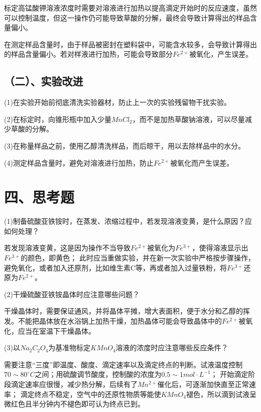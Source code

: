 \documentclass[a4paper,12pt]{article}
\begin{document}
标定高锰酸钾溶液浓度时需要对溶液进行加热以提高滴定开始时的反应速度，虽然可以控制温度，但这一操作仍可能导致草酸的分解，最终会导致计算得出的样品含量偏小。

在测定样品含量时，由于样品被密封在塑料袋中，可能含水较多，会导致计算得出的样品含量偏小。若对样液进行加热，可能会导致部分$ Fe^{2+}$被氧化，产生误差。

\subsection*{（二）、实验改进}
(1)在实验开始前彻底清洗实验器材，防止上一次的实验残留物干扰实验。

(2)在标定时，向锥形瓶中加入少量$ MnCl_2$，而不是加热草酸钠溶液，可以尽量减少草酸的分解。

(3)在称量样品之前，使用乙醇清洗样品，而后晾干，用以去除样品中的水分。

(4)测定样品含量时，避免对溶液进行加热，防止$ Fe^{2+}$被氧化而产生误差。



\section*{四、思考题}

(1)制备硫酸亚铁铵时，在蒸发、浓缩过程中，若发现溶液变黄，是什么原因？应如何处理？

若发现溶液变黄，这是因为操作不当导致$ Fe^{2+}$被氧化为$ Fe^{3+}$，使得溶液显示出$ Fe^{3+}$的颜色，即黄色；
此时应当重做实验，并在新一次实验中严格按步骤操作，避免氧化，或者加入还原剂，比如维生素C等，再或者加入过量铁粉，将$ Fe^{3+}$还原为$ Fe^{2+}$。

(2)干燥硫酸亚铁铵晶体时应注意哪些问题？

干燥晶体时，需要保证通风，并将晶体平摊，增大表面积，便于水分和乙醇的挥发。不能把晶体放在水浴锅上加热干燥，加热晶体可能会导致晶体中的$ Fe^{2+}$被氧化，应当在室温下干燥晶体。

(3)以$ Na_2C_2O_4$为基准物标定$ KMnO_4$溶液的浓度时应注意哪些反应条件？

需要注意“三度”即温度、酸度、滴定速率以及滴定终点的判断。试液温度控制$ 70\sim 80^{\circ}C$之间；用硫酸调节酸度，控制酸的浓度为$ 0.5\sim 1mol\cdot L^{-1}$；
开始滴定阶段滴定速率应很慢，减少热分解，后续有了$ Mn^{2+}$催化后，可逐渐加快直至正常速率；
滴定终点不稳定，空气中的还原性物质等能使$ KMnO_4$褪色，所以滴到试液呈微红色且半分钟内不褪色即可认为终点已到。

%
%
\end{document}
